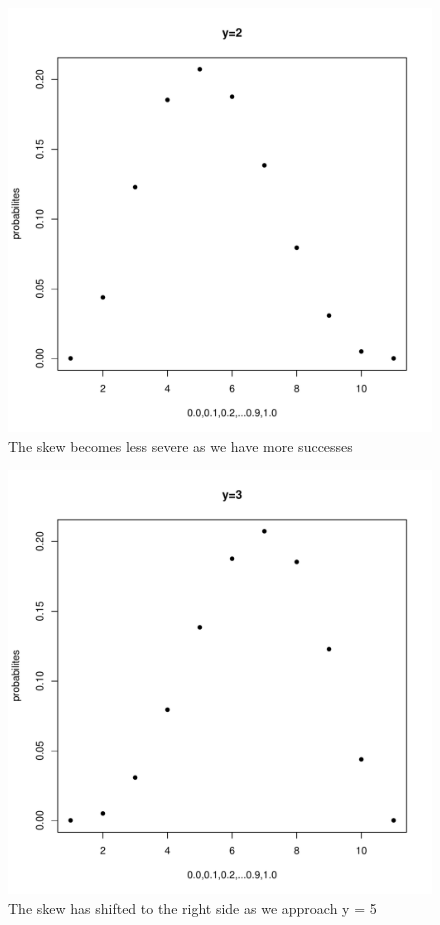\documentclass[11pt]{article}
\begin{document}
\begin{enumerate}
\begin{enumerate}
\begin{figure}[H]
	\end{figure}
	\begin{figure}[H]
		\centering
		\caption{The skew becomes less severe as we have more successes}
		\includegraphics[scale=.6]{y=2graph.pdf}
	\end{figure}
	\begin{figure}[H]
		\centering
		\caption{The skew has shifted to the right side as we approach y = 5}
		\includegraphics[scale=.6]{y=3graph.pdf}

\end{figure}
\end{enumerate}
\end{enumerate}
\end{document}
